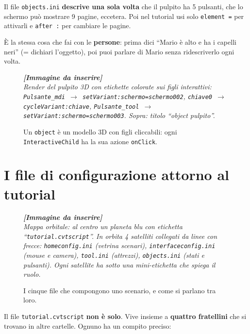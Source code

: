 ﻿\documentclass[a4paper,12pt,oneside]{book}
\newcommand{\kw}[1]{\texttt{\color{keycolor}#1}}
\newcommand{\file}[1]{\texttt{#1}}
\newcommand{\imgph}[2]{%
  \begin{tcolorbox}[colback=cvtlightblue!30,colframe=cvtblue!40,%
    width=#1,halign=center,valign=center,height=5cm,boxrule=0.5pt,arc=3pt]%
    \textcolor{cvtgray}{\itshape\footnotesize\textbf{[Immagine da inserire]}\\[3pt]#2}%
  \end{tcolorbox}}
\begin{document}
\begin{notablu}
Il file \file{objects.ini} \textbf{descrive una sola volta} che il pulpito ha 5
pulsanti, che lo schermo può mostrare 9 pagine, eccetera. Poi nel tutorial usi
solo \kw{element =} per attivarli e \kw{after :} per cambiare le pagine.

È la stessa cosa che fai con le \textbf{persone}: prima dici ``Mario è alto e ha
i capelli neri'' (= dichiari l'oggetto), poi puoi parlare di Mario senza
ridescriverlo ogni volta.
\end{notablu}

\begin{figure}[H]
  \centering
  \imgph{12cm}{Render del pulpito 3D con etichette colorate sui figli interattivi: \texttt{Pulsante\_mdi $\rightarrow$ setVariant:schermo=schermo002}, \texttt{chiave0 $\rightarrow$ cycleVariant:chiave}, \texttt{Pulsante\_tool $\rightarrow$ setVariant:schermo=schermo003}. Sopra: titolo ``object pulpito''.}
  \caption{Un \texttt{object} è un modello 3D con figli cliccabili: ogni \texttt{InteractiveChild} ha la sua azione \texttt{onClick}.}
  \label{fig:object-pulpito}
\end{figure}

\chapter{I file di configurazione attorno al tutorial}
\label{ch:config}

\begin{figure}[H]
  \centering
  \imgph{13cm}{Mappa orbitale: al centro un planeta blu con etichetta ``\file{tutorial.cvtscript}''. In orbita 4 satelliti collegati da linee con frecce: \file{homeconfig.ini} (vetrina scenari), \file{interfaceconfig.ini} (mouse e camera), \file{tool.ini} (attrezzi), \file{objects.ini} (stati e pulsanti). Ogni satellite ha sotto una mini-etichetta che spiega il ruolo.}
  \caption{I cinque file che compongono uno scenario, e come si parlano tra loro.}
  \label{fig:mappa-orbitale}
\end{figure}

Il file \file{tutorial.cvtscript} \textbf{non è solo}. Vive insieme a
\textbf{quattro fratellini} che si trovano in altre cartelle. Ognuno ha un
compito preciso:
\end{document}
